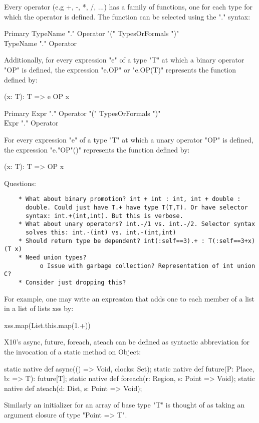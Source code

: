 Every operator (e.g +, -, *, /, ...) has a family of functions, one for
each type for which the operator is defined. The function can be
selected using the "." syntax:

\begin{grammar}
Primary \: TypeName \xcd"." Operator \xcd"(" TypesOrFormals \xcd")" \\
        \| TypeName \xcd"." Operator \\
\end{grammar}

Additionally, for every expression \xcd"e" of a type \xcd"T" at which a binary
operator \xcd"OP" is defined, the expression \xcd"e.OP" or
\xcd"e.OP(T)" represents the function
defined by:

\begin{xten}
(x: T): T => { e OP x }
\end{xten}

\begin{grammar}
Primary \: Expr \xcd"." Operator \xcd"(" TypesOrFormals \xcd")" \\
        \| Expr \xcd"." Operator \\
\end{grammar}

For every expression \xcd"e" of a type \xcd"T" at which a unary
operator \xcd"OP" is defined, the expression \xcd"e."OP\xcd"()" represents the function
defined by:

\begin{xten}
(x: T): T => { OP x }
\end{xten}

Questions:

\begin{verbatim}
    * What about binary promotion? int + int : int, int + double :
      double. Could just have T.+ have type T(T,T). Or have selector
      syntax: int.+(int,int). But this is verbose.
    * What about unary operators? int.-/1 vs. int.-/2. Selector syntax
      solves this: int.-(int) vs. int.-(int,int)
    * Should return type be dependent? int(:self==3).+ : T(:self==3+x)(T x)
    * Need union types?
          o Issue with garbage collection? Representation of int union C? 
    * Consider just dropping this? 
\end{verbatim}


For example,
one may write an expression that adds one to each member of a list in a
list of lists xss by:

\begin{xten}
xss.map(List.this.map(1.+))
\end{xten}

X10's async, future, foreach, ateach can be defined as syntactic
abbreviation for the invocation of a static method on Object:

\begin{xten}
static native def async(() => Void, clocks: Set);
static native def future(P: Place, b: => T): future[T];
static native def foreach(r: Region, s: Point => Void);
static native def ateach(d: Dist, s: Point => Void);
\end{xten}

Similarly an initializer for an array of base type \xcd"T" is thought of as
taking an argument closure of type \xcd"Point => T".



